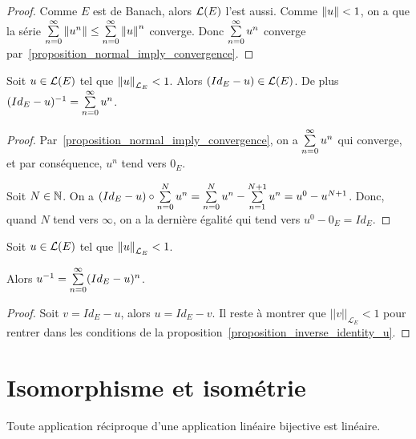 \begin{proof}
	Comme $E$ est de Banach, alors $\mathcal{L}(E)$ l'est aussi. Comme $\norm{u}
	< 1$, on a que la série $\sum\limits_{n = 0}^{\infty} \norm{u^{n}} \leq
	\sum\limits_{n = 0}^{\infty} \norm{u}^{n}$ converge. Donc
	$\sum\limits_{n = 0}^{\infty} u^{n}$ converge
	par~\ref{proposition_normal_imply_convergence}.
\end{proof}

\newcommand{\inverseU}[1]{$\GSsum{n}{0}{\infty}{(Id_{E} - #1)^{n}}$}

\begin{proposition}
\label{proposition_inverse_identity_u}
	Soit $u \in \mathcal{L}(E)$ tel que $\norm{u}_{\mathcal{L}_{E}} < 1$. Alors
	$(Id_{E} - u) \in \mathcal{L}(E)$. De plus $(Id_{E} - u)^{-1} =
	\sum\limits_{n = 0}^{\infty} u^{n}$.
\end{proposition}


\begin{proof}
	Par~\ref{proposition_normal_imply_convergence}, on a
	$\sum\limits_{n = 0}^{\infty} u^{n}$ qui converge, et par conséquence, $u^{n}$ tend
	vers $0_{E}$.

	Soit $N \in \mathbb{N}$. On a $(Id_{E} - u) \circ \sum\limits_{n = 0}^{N} u^{n} =
	\sum\limits_{n = 0}^{N} u^{n} - \sum\limits_{n = 1}^{N + 1} u^{n} = u^{0} - u^{N
	+ 1}$. Donc, quand $N$ tend vers $\infty$, on a la dernière égalité qui tend
	vers $u^{0} - 0_{E} = Id_{E}$.
\end{proof}

\begin{corollary}
	Soit $u \in \mathcal{L}(E)$ tel que $\norm{u}_{\mathcal{L}_{E}} < 1$.
	
	Alors $u^{-1} = \sum\limits_{n = 0}^{\infty} (Id_{E} - u)^{n}$.
\end{corollary}

\begin{proof}
	Soit $v = Id_{E} - u$, alors $u = Id_{E} - v$. Il reste à montrer que
	$||v||_{\mathcal{L}_{E}} < 1$ pour rentrer dans les conditions de la
	proposition~\ref{proposition_inverse_identity_u}.
\end{proof}


\section{Isomorphisme et isométrie}

\begin{proposition}
	Toute application réciproque d'une application linéaire bijective est
	linéaire.
\end{proposition}

